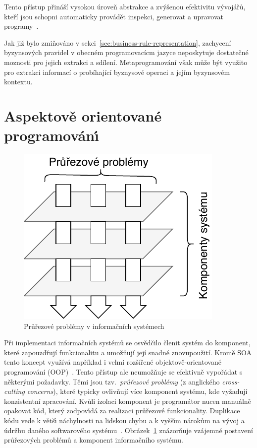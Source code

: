 Tento přístup přináší vysokou úroveň abstrakce a zvýšenou efektivitu
vývojářů, kteří jsou schopni automaticky provádět inspekci, generovat a upravovat
programy~\cite{sheard2001accomplishments}.

Jak již bylo zmiňováno v sekci~\ref{sec:business-rule-representation}, zachycení byzynsových
pravidel v obecném programovacícm jazyce neposkytuje dostatečné moznosti pro jejich extrakci
a sdílení. Metaprogramování však může být využito pro extrakci informací o probíhající
byznysové operaci a jejím byzynsovém kontextu.

\section{Aspektově orientované programován\'{\i}}\label{sec:aop}


\begin{figure}[t]
    \centering
    \includegraphics[keepaspectratio=true, width=0.35\linewidth]{figures/cross-cutting.pdf}
    \caption{Průřezové problémy v informačních systémech}
    \label{fig:cross-cutting}
\end{figure}

Při implementaci informačních systémů se osvědčilo členit systém do komponent, které
zapouzdřují funkcionalitu a umožňují její snadné znovupoužití. Kromě \gls{SOA} tento koncept
využívá například i velmi rozšířené objektově-orientované programování (\gls{OOP})~\cite{rentsch1982object}.
Tento přístup ale neumožňuje se efektivně vypořádat s některými požadavky.
Těmi jsou tzv.~\textit{průřezové problémy} (z anglického \textit{cross-cutting concerns}),
které typicky ovlivňují více komponent systému, kde vyžadují konzistentní zpracování.
Kvůli izolaci komponent je programátor nucen manuálně opakovat
kód, kter\'y zodpov\'{\i}dá za realizaci průřezové funkcionality. Duplikace kódu
vede k větš\'{\i} náchylnosti na lidskou chybu a k vyšš\'{\i}m nárokům na v\'yvoj
a údržbu daného softwarového systému~\cite{fowler1999refactoring}.
Obrázek~\ref{fig:cross-cutting} znázorňuje vzájemné postavení průřezových
problémů a komponent informačního systému.

